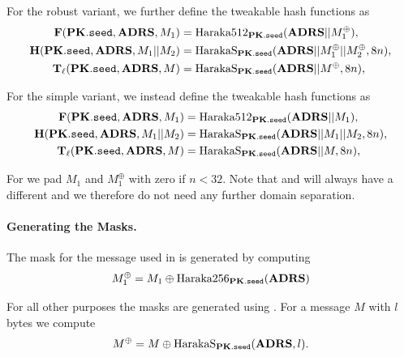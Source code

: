    For the robust variant, we further define the tweakable hash functions as
   \begin{equation}
   \begin{aligned}
      \mathbf{F}(\mathbf{PK}.\texttt{seed}, \textbf{ADRS}, M_1) &= \text{Haraka}512_{\mathbf{PK}.\texttt{seed}}(\textbf{ADRS} || M_1^{\oplus}),\\
      \mathbf{H}(\mathbf{PK}.\texttt{seed}, \textbf{ADRS}, M_1 || M_2) &=  \text{HarakaS}_{\mathbf{PK}.\texttt{seed}}(\textbf{ADRS} || 
                                           M_1^{\oplus} || M_2^{\oplus}, 8n),\\
      \mathbf{T}_\ell(\mathbf{PK}.\texttt{seed}, \textbf{ADRS}, M) &=  \text{HarakaS}_{\mathbf{PK}.\texttt{seed}}(\textbf{ADRS} || M^{\oplus}, 8n),\\
   \end{aligned}
   \end{equation}

   For the simple variant, we instead define the tweakable hash functions as
   \begin{equation}
   \begin{aligned}
      \mathbf{F}(\mathbf{PK}.\texttt{seed}, \textbf{ADRS}, M_1) &= \text{Haraka}512_{\mathbf{PK}.\texttt{seed}}(\textbf{ADRS} || M_1),\\
      \mathbf{H}(\mathbf{PK}.\texttt{seed}, \textbf{ADRS}, M_1 || M_2) &=  \text{HarakaS}_{\mathbf{PK}.\texttt{seed}}(\textbf{ADRS} || 
                                           M_1 || M_2, 8n),\\
      \mathbf{T}_\ell(\mathbf{PK}.\texttt{seed}, \textbf{ADRS}, M) &=  \text{HarakaS}_{\mathbf{PK}.\texttt{seed}}(\textbf{ADRS} || M, 8n),\\
   \end{aligned}
   \end{equation}

   For \sphincsF we pad $M_1$ and $M_1^{\oplus}$ with zero if $n < 32$.
   Note that \sphincsH 
   and \sphincsHmsg will always have a different \adrs and we therefore do not 
   need any further domain separation.

   \paragraph{Generating the Masks.} The mask for the message used in \sphincsF 
   is generated by computing
   \begin{equation}
      M_1^{\oplus} = M_1 \oplus \text{Haraka}256_{\mathbf{PK}.\texttt{seed}}(\textbf{ADRS})
   \end{equation}

   For all other purposes the masks are generated using \harakasponge. For a 
   message $M$ with $l$ bytes we compute
   \begin{equation*}
      M^{\oplus} = M \oplus \text{HarakaS}_{\mathbf{PK}.\texttt{seed}}(\textbf{ADRS}, l).
   \end{equation*}

